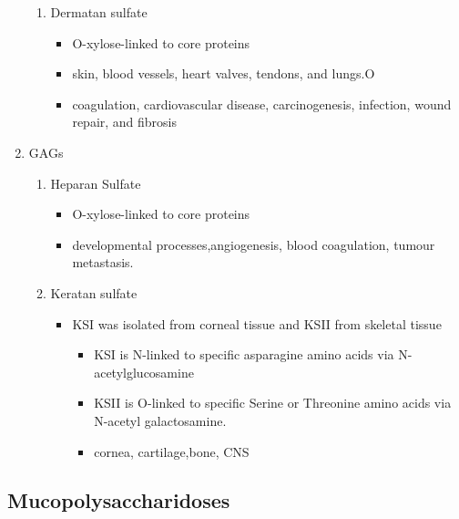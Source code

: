 \documentclass{scrartcl}
\begin{document}
\begin{enumerate}
\begin{enumerate}
\item Dermatan sulfate
\label{sec:org4f03874}
\begin{itemize}
\item O-xylose-linked to core proteins
\item skin, blood vessels, heart valves, tendons, and lungs.O
\item coagulation, cardiovascular disease, carcinogenesis, infection, wound repair, and fibrosis
\end{itemize}
\end{enumerate}

\item GAGs
\label{sec:org903fb2e}

\begin{enumerate}
\item Heparan Sulfate
\label{sec:orgc04ed21}
\begin{itemize}
\item O-xylose-linked to core proteins
\item developmental processes,angiogenesis, blood coagulation, tumour metastasis.
\end{itemize}

\item Keratan sulfate
\label{sec:org3505f67}
\begin{itemize}
\item KSI was isolated from corneal tissue and KSII from skeletal tissue
\begin{itemize}
\item KSI is N-linked to specific asparagine amino acids via
N-acetylglucosamine
\item KSII is O-linked to specific Serine or Threonine amino acids via
N-acetyl galactosamine.
\item cornea, cartilage,bone, CNS
\end{itemize}
\end{itemize}
\end{enumerate}
\end{enumerate}


\subsection{Mucopolysaccharidoses}
\label{sec:org2f2a663}
\end{document}
